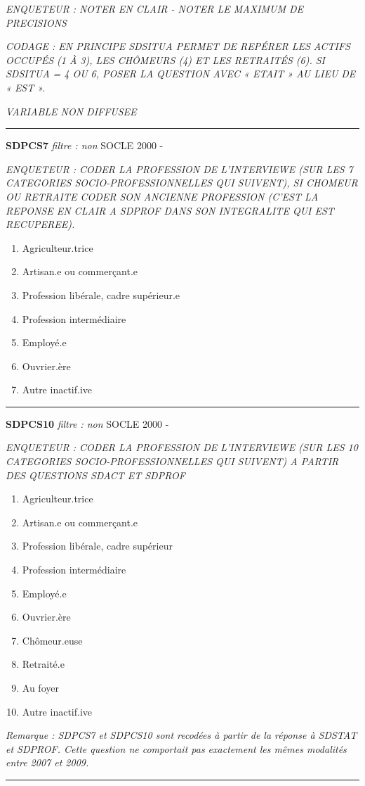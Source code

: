 \documentclass[12pt,a4paper]{reedthesis}
\providecommand{\tightlist}{%
  \setlength{\itemsep}{0pt}\setlength{\parskip}{0pt}}
\begin{document}
\emph{ENQUETEUR : NOTER EN CLAIR - NOTER LE MAXIMUM DE PRECISIONS}

\emph{CODAGE : EN PRINCIPE SDSITUA PERMET DE REPÉRER LES ACTIFS OCCUPÉS (1 À 3), LES CHÔMEURS (4) ET LES RETRAITÉS (6). SI SDSITUA = 4 OU 6, POSER LA QUESTION AVEC « ETAIT » AU LIEU DE « EST ».}

\emph{VARIABLE NON DIFFUSEE}
\begin{center}\rule{0.5\linewidth}{0.5pt}\end{center}

\textbf{SDPCS7} \emph{filtre : non} SOCLE 2000 -

\emph{ENQUETEUR : CODER LA PROFESSION DE L'INTERVIEWE (SUR LES 7 CATEGORIES SOCIO-PROFESSIONNELLES QUI SUIVENT), SI CHOMEUR OU RETRAITE CODER SON ANCIENNE PROFESSION (C'EST LA REPONSE EN CLAIR A SDPROF DANS SON INTEGRALITE QUI EST RECUPEREE).}
\begin{enumerate}
\def\labelenumi{\arabic{enumi}.}
\tightlist
\item
  Agriculteur.trice
\item
  Artisan.e ou commerçant.e
\item
  Profession libérale, cadre supérieur.e
\item
  Profession intermédiaire
\item
  Employé.e
\item
  Ouvrier.ère
\item
  Autre inactif.ive
\end{enumerate}
\begin{center}\rule{0.5\linewidth}{0.5pt}\end{center}

\textbf{SDPCS10} \emph{filtre : non} SOCLE 2000 -

\emph{ENQUETEUR : CODER LA PROFESSION DE L'INTERVIEWE (SUR LES 10 CATEGORIES SOCIO-PROFESSIONNELLES QUI SUIVENT) A PARTIR DES QUESTIONS SDACT ET SDPROF}
\begin{enumerate}
\def\labelenumi{\arabic{enumi}.}
\tightlist
\item
  Agriculteur.trice
\item
  Artisan.e ou commerçant.e
\item
  Profession libérale, cadre supérieur
\item
  Profession intermédiaire
\item
  Employé.e
\item
  Ouvrier.ère\\
\item
  Chômeur.euse
\item
  Retraité.e
\item
  Au foyer
\item
  Autre inactif.ive
\end{enumerate}
\emph{Remarque : SDPCS7 et SDPCS10 sont recodées à partir de la réponse à SDSTAT et SDPROF. Cette question ne comportait pas exactement les mêmes modalités entre 2007 et 2009.}
\begin{center}\rule{0.5\linewidth}{0.5pt}\end{center}
\end{document}
